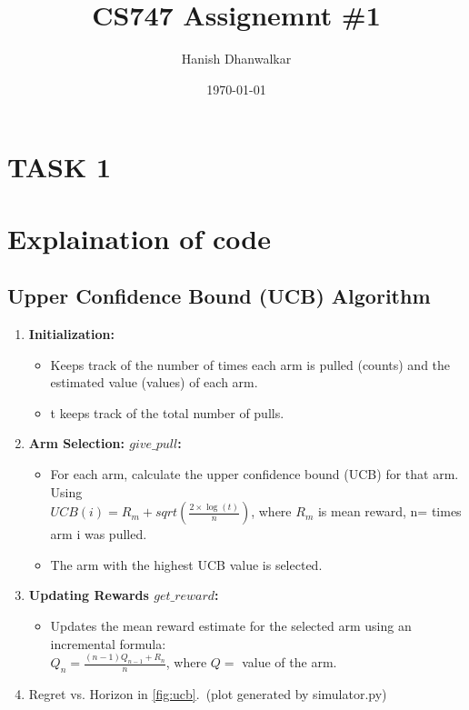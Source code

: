 \documentclass{article}
\title{CS747 Assignemnt \#1}
\author{Hanish Dhanwalkar}
\date{\today}
\begin{document}
\maketitle

\section*{TASK 1}

\section{Explaination of code}
    \subsection{Upper Confidence Bound (UCB) Algorithm}
    \begin{enumerate}
        \item \textbf{Initialization:} \begin{itemize}
            \item Keeps track of the number of times each arm is pulled (counts) and the estimated value (values) of each arm.
            \item t keeps track of the total number of pulls.
        \end{itemize}

        \item \textbf{Arm Selection: \(give\_pull\):} \begin{itemize}
            \item For each arm, calculate the upper confidence bound (UCB) for that arm. Using \\ $UCB(i) = R_m + sqrt(\frac{2\times \log(t)}{n})$, where $R_m$ is mean reward, n= times arm i was pulled.
            \item The arm with the highest UCB value is selected.
        \end{itemize}


        \item \textbf{Updating Rewards \(get\_reward\):} \begin{itemize}
            \item Updates the mean reward estimate for the selected arm using an incremental formula: \\ $Q_n = \frac{(n-1)Q_{n-1}+R_n}{n}$, where $Q =$ value of the arm.
        \end{itemize}

        \item Regret vs. Horizon in \autoref{fig:ucb}.\ (plot generated by simulator.py)
    \end{enumerate}
\end{document}
